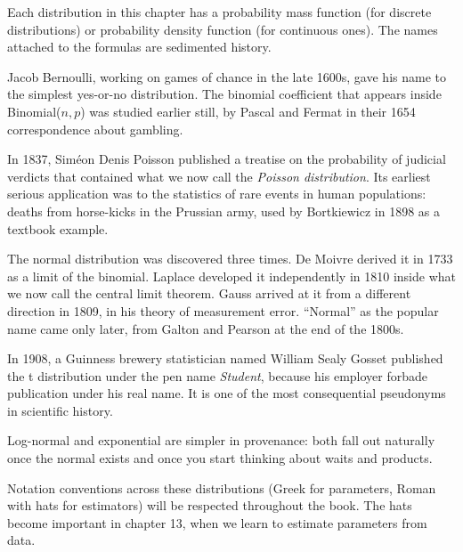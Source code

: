 \documentclass[
  letterpaper,
  11pt,
  twoside,
  openany]{scrbook}
\begin{document}
\begin{tcolorbox}[enhanced jigsaw, arc=.35mm, bottomrule=.15mm, bottomtitle=1mm, breakable, colback=white, colbacktitle=quarto-callout-note-color!10!white, colframe=quarto-callout-note-color-frame, coltitle=black, left=2mm, leftrule=.75mm, opacityback=0, opacitybacktitle=0.6, rightrule=.15mm, title=\textcolor{quarto-callout-note-color}{\faInfo}\hspace{0.5em}{Inside the math: where the names come from}, titlerule=0mm, toprule=.15mm, toptitle=1mm]

Each distribution in this chapter has a probability mass function (for
discrete distributions) or probability density function (for continuous
ones). The names attached to the formulas are sedimented history.

Jacob Bernoulli, working on games of chance in the late 1600s, gave his
name to the simplest yes-or-no distribution. The binomial coefficient
that appears inside Binomial(\(n, p\)) was studied earlier still, by
Pascal and Fermat in their 1654 correspondence about gambling.

In 1837, Siméon Denis Poisson published a treatise on the probability of
judicial verdicts that contained what we now call the \emph{Poisson
distribution}. Its earliest serious application was to the statistics of
rare events in human populations: deaths from horse-kicks in the
Prussian army, used by Bortkiewicz in 1898 as a textbook example.

The normal distribution was discovered three times. De Moivre derived it
in 1733 as a limit of the binomial. Laplace developed it independently
in 1810 inside what we now call the central limit theorem. Gauss arrived
at it from a different direction in 1809, in his theory of measurement
error. ``Normal'' as the popular name came only later, from Galton and
Pearson at the end of the 1800s.

In 1908, a Guinness brewery statistician named William Sealy Gosset
published the t distribution under the pen name \emph{Student}, because
his employer forbade publication under his real name. It is one of the
most consequential pseudonyms in scientific history.

Log-normal and exponential are simpler in provenance: both fall out
naturally once the normal exists and once you start thinking about waits
and products.

Notation conventions across these distributions (Greek for parameters,
Roman with hats for estimators) will be respected throughout the book.
The hats become important in chapter 13, when we learn to estimate
parameters from data.

\end{tcolorbox}
\end{document}
